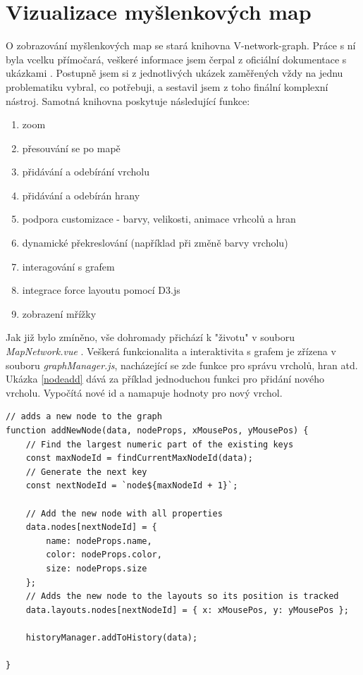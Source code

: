 \section{Vizualizace myšlenkových map}
\label{vizualizcemap}
O zobrazování myšlenkových map se stará knihovna V-network-graph. Práce s ní byla vcelku přímočará, veškeré informace jsem čerpal z oficiální dokumentace s ukázkami \cite{vnetexamples}. Postupně jsem si z jednotlivých ukázek zaměřených vždy na jednu problematiku vybral, co potřebuji, a sestavil jsem z toho finální komplexní nástroj.
\newline
Samotná knihovna poskytuje následující funkce:
\begin{enumerate}
    \item zoom
    \item přesouvání se po mapě
    \item přidávání a odebírání vrcholu
    \item přidávání a odebírán hrany
    \item podpora customizace - barvy, velikosti, animace vrhcolů a hran
    \item dynamické překreslování (například při změně barvy vrcholu)
    \item interagování s grafem
    \item integrace force layoutu pomocí D3.js
    \item zobrazení mřížky
\end{enumerate}
\newpage
Jak již bylo zmíněno, vše dohromady přichází k "životu" v souboru \textit{MapNetwork.vue} . Veškerá funkcionalita a interaktivita s grafem je zřízena v souboru \textit{graphManager.js}, nacházející se zde funkce pro správu vrcholů, hran atd. Ukázka \ref{nodeadd} dává za příklad jednoduchou funkci pro přidání nového vrcholu. Vypočítá nové id a namapuje hodnoty pro nový vrchol. 
\begin{lstlisting}[style=JavaScript, firstnumber = 5, caption={utils/graphManager.js, přidání vrcholu do grafu},
label={nodeadd}]
// adds a new node to the graph
function addNewNode(data, nodeProps, xMousePos, yMousePos) {
    // Find the largest numeric part of the existing keys
    const maxNodeId = findCurrentMaxNodeId(data);
    // Generate the next key
    const nextNodeId = `node${maxNodeId + 1}`;
    
    // Add the new node with all properties
    data.nodes[nextNodeId] = {
        name: nodeProps.name,
        color: nodeProps.color,
        size: nodeProps.size
    };
    // Adds the new node to the layouts so its position is tracked
    data.layouts.nodes[nextNodeId] = { x: xMousePos, y: yMousePos };
    
    historyManager.addToHistory(data);
    
}
\end{lstlisting}
